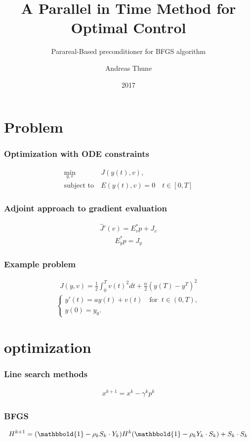 \documentclass{beamer}
\title{A Parallel in Time Method for Optimal Control}
\subtitle{Parareal-Based preconditioner for BFGS algorithm}
\author{Andreas Thune}
\date{2017}
\begin{document}
 
\frame{\titlepage}
\tableofcontents
\section{Problem}
\begin{frame}
\frametitle{Optimization with ODE constraints}

\begin{align*}
\min_{y,v} &J(y(t),v), \\
\textrm{subject to} \ &E(y(t),v)=0\quad t\in[0,T]
\end{align*}
\end{frame}
\begin{frame}
\frametitle{Adjoint approach to gradient evaluation}
\begin{align*}
\hat J'(v)=E_v^*p +J_v
\end{align*}
\begin{align*}
E_y^*p = J_y
\end{align*}
\end{frame}
\begin{frame}
\frametitle{Example problem}
\begin{align*}
J(y,v) = \frac{1}{2}\int_0^Tv(t)^2dt + \frac{\alpha}{2}(y(T)-y^T)^2 
\end{align*}
\begin{align*}
\left\{
     \begin{array}{lr}
       	y'(t)=ay(t) + v(t) \quad \textrm{for } \ t\in(0,T),\\
       	y(0)=y_0.
     \end{array}
   \right. 
\end{align*}
\end{frame}
\section{optimization}
\begin{frame}
\frametitle{Line search methods}
\begin{align*}
x^{k+1} = x^k -\gamma^k p^k
\end{align*}
\end{frame}
\begin{frame}
\frametitle{BFGS}
\begin{align*}
H^{k+1} = (\mathbbold{1}-\rho_kS_k\cdot Y_k)H^k(\mathbbold{1} -\rho_kY_k\cdot S_k) + S_k\cdot S_k
\end{align*}
\end{frame}
\end{document}
